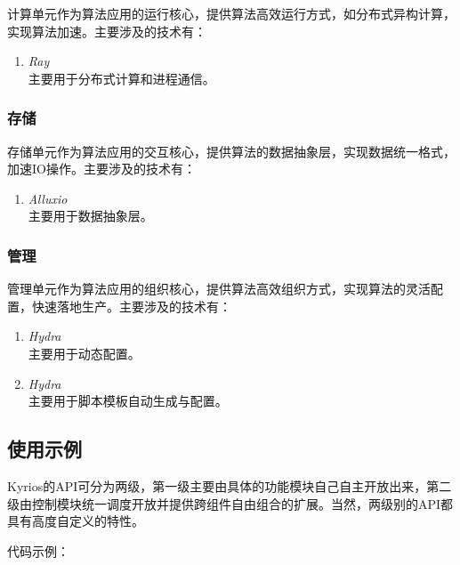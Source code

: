 \documentclass[cn,hazy,blue,14pt,screen]{elegantnote}
\begin{document}
计算单元作为算法应用的运行核心，提供算法高效运行方式，如分布式异构计算，实现算法加速。主要涉及的技术有：
\begin{enumerate}[label=\arabic*).]
	\item \textit{Ray}\\
	主要用于分布式计算和进程通信。
\end{enumerate}



\subsubsection{存储}

存储单元作为算法应用的交互核心，提供算法的数据抽象层，实现数据统一格式，加速IO操作。主要涉及的技术有：
\begin{enumerate}[label=\arabic*).]
	\item \textit{Alluxio}\\
	主要用于数据抽象层。
\end{enumerate}



\subsubsection{管理}

管理单元作为算法应用的组织核心，提供算法高效组织方式，实现算法的灵活配置，快速落地生产。主要涉及的技术有：
\begin{enumerate}[label=\arabic*).]
	\item \textit{Hydra}\\
	主要用于动态配置。
	\item \textit{Hydra}\\
	主要用于脚本模板自动生成与配置。	
\end{enumerate}







\subsection{使用示例}

Kyrios的API可分为两级，第一级主要由具体的功能模块自己自主开放出来，第二级由控制模块统一调度开放并提供跨组件自由组合的扩展。当然，两级别的API都具有高度自定义的特性。

代码示例：
\end{document}
